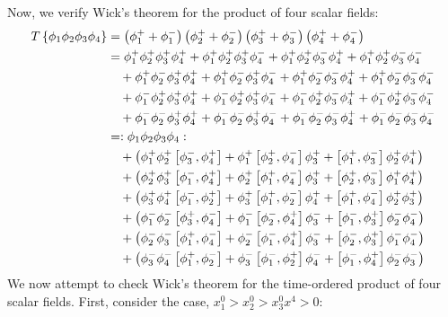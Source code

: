 {Now, we verify Wick's theorem for the product of four scalar fields:
\begin{align}
    T\left\{\phi_1 \phi_2 \phi_3 \phi_4\right\} &= \left(\phi_1^+ + \phi_1^-\right)\left(\phi_2^+ + \phi_2^-\right)\left(\phi_3^+ + \phi_3^-\right)\left(\phi_4^+ + \phi_4^-\right) \notag \\
    &= \phi_1^+ \phi_2^+ \phi_3^+ \phi_4^+ + \phi_1^+ \phi_2^+ \phi_3^+ \phi_4^- + \phi_1^+ \phi_2^+ \phi_3^- \phi_4^+ + \phi_1^+ \phi_2^+ \phi_3^- \phi_4^- \notag \\
    &\quad + \phi_1^+ \phi_2^- \phi_3^+ \phi_4^+ + \phi_1^+ \phi_2^- \phi_3^+ \phi_4^- + \phi_1^+ \phi_2^- \phi_3^- \phi_4^+ + \phi_1^+ \phi_2^- \phi_3^- \phi_4^- \notag \\
    &\quad + \phi_1^- \phi_2^+ \phi_3^+ \phi_4^+ + \phi_1^- \phi_2^+ \phi_3^+ \phi_4^- + \phi_1^- \phi_2^+ \phi_3^- \phi_4^+ + \phi_1^- \phi_2^+ \phi_3^- \phi_4^- \notag \\
    &\quad + \phi_1^- \phi_2^- \phi_3^+ \phi_4^+ + \phi_1^- \phi_2^- \phi_3^+ \phi_4^- + \phi_1^- \phi_2^- \phi_3^- \phi_4^+ + \phi_1^- \phi_2^- \phi_3^- \phi_4^- \notag \\
    &= :\phi_1 \phi_2 \phi_3 \phi_4: \notag \\
    &\quad + \left(\phi_1^+ \phi_2^+ \left[\phi_3^-, \phi_4^+\right] + \phi_1^+ \left[\phi_2^+, \phi_4^-\right] \phi_3^+ + \left[\phi_1^+, \phi_3^-\right] \phi_2^+ \phi_4^+ \right) \notag \\
    &\quad + \left(\phi_2^+ \phi_3^+ \left[\phi_1^-, \phi_4^+\right] + \phi_2^+ \left[\phi_1^+, \phi_4^-\right] \phi_3^+ + \left[\phi_2^+, \phi_3^-\right] \phi_1^+ \phi_4^+ \right) \notag \\
    &\quad + \left(\phi_3^+ \phi_4^+ \left[\phi_1^-, \phi_2^+\right] + \phi_3^+ \left[\phi_1^+, \phi_2^-\right] \phi_4^+ + \left[\phi_1^+, \phi_4^-\right] \phi_2^+ \phi_3^+ \right) \notag \\
    &\quad + \left(\phi_1^- \phi_2^- \left[\phi_3^+, \phi_4^-\right] + \phi_1^- \left[\phi_2^-, \phi_4^+\right] \phi_3^- + \left[\phi_1^-, \phi_3^+\right] \phi_2^- \phi_4^- \right) \notag \\
    &\quad + \left(\phi_2^- \phi_3^- \left[\phi_1^+, \phi_4^-\right] + \phi_2^- \left[\phi_1^-, \phi_4^+\right] \phi_3^- + \left[\phi_2^-, \phi_3^+\right] \phi_1^- \phi_4^- \right) \notag \\
    &\quad + \left(\phi_3^- \phi_4^- \left[\phi_1^+, \phi_2^-\right] + \phi_3^- \left[\phi_1^-, \phi_2^+\right] \phi_4^- + \left[\phi_1^-, \phi_4^+\right] \phi_2^- \phi_3^- \right)
\end{align}
We now attempt to check Wick's theorem for the time-ordered product of four scalar fields. First, consider the case, $x_1^0>x_2^0>x_3^0x^4>0$:

}
